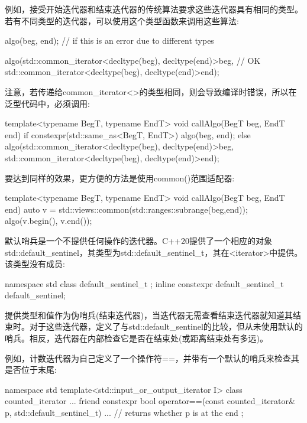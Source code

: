 例如，接受开始迭代器和结束迭代器的传统算法要求这些迭代器具有相同的类型。若有不同类型的迭代器，可以使用这个类型函数来调用这些算法:

\begin{cpp}
algo(beg, end); // if this is an error due to different types

algo(std::common_iterator<decltype(beg), decltype(end)>{beg}, // OK
std::common_iterator<decltype(beg), decltype(end)>{end});
\end{cpp}

注意，若传递给common\_iterator<>的类型相同，则会导致编译时错误，所以在泛型代码中，必须调用:

\begin{cpp}
template<typename BegT, typename EndT>
void callAlgo(BegT beg, EndT end)
{
	if constexpr(std::same_as<BegT, EndT>) {
		algo(beg, end);
	}
	else {
		algo(std::common_iterator<decltype(beg), decltype(end)>{beg},
		std::common_iterator<decltype(beg), decltype(end)>{end});
	}
}
\end{cpp}

要达到同样的效果，更方便的方法是使用common()范围适配器:

\begin{cpp}
template<typename BegT, typename EndT>
void callAlgo(BegT beg, EndT end)
{
	auto v = std::views::common(std::ranges::subrange(beg,end));
	algo(v.begin(), v.end());
}
\end{cpp}


默认哨兵是一个不提供任何操作的迭代器。C++20提供了一个相应的对象std::default\_sentinel，其类型为std::default\_sentinel\_t，其在<iterator>中提供。该类型没有成员:

\begin{cpp}
namespace std {
	class default_sentinel_t {
	};
	inline constexpr default_sentinel_t default_sentinel{};
}
\end{cpp}

提供类型和值作为伪哨兵(结束迭代器)，当迭代器无需查看结束迭代器就知道其结束时。对于这些迭代器，定义了与std::default\_sentinel的比较，但从未使用默认的哨兵。相反，迭代器在内部检查它是否在结束处(或距离结束处有多远)。

例如，计数迭代器为自己定义了一个操作符==，并带有一个默认的哨兵来检查其是否位于末尾:

\begin{cpp}
namespace std {
	template<std::input_or_output_iterator I>
	class counted_iterator {
		...
		friend constexpr bool operator==(const counted_iterator& p,
		std::default_sentinel_t) {
			... // returns whether p is at the end
		}
	};
}
\end{cpp}


